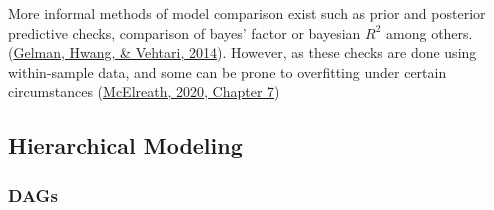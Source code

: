 \documentclass[12pt,twoside]{reedthesis}
\begin{document}
More informal methods of model comparison exist such as prior and posterior predictive checks, comparison of bayes' factor or bayesian \(R^2\) among others. (\protect\hyperlink{ref-gelmanUnderstandingPredictiveInformation2014}{Gelman, Hwang, \& Vehtari, 2014}). However, as these checks are done using within-sample data, and some can be prone to overfitting under certain circumstances (\protect\hyperlink{ref-mcelreathStatisticalRethinkingBayesian2020}{McElreath, 2020, Chapter 7})

\hypertarget{hierarchical-modeling}{%
\subsection{Hierarchical Modeling}\label{hierarchical-modeling}}

\hypertarget{dags}{%
\subsubsection{DAGs}\label{dags}}
\end{document}
